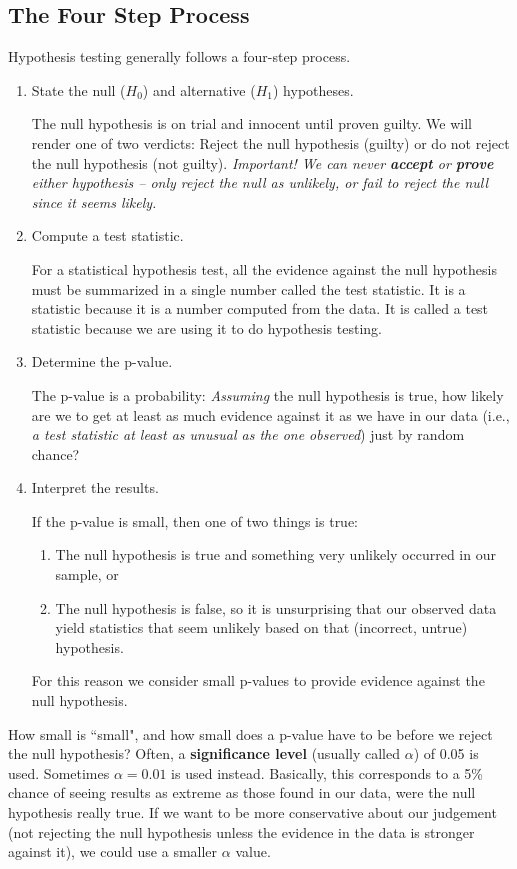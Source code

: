 \documentclass[twoside]{book}\usepackage[]{graphicx}\usepackage[]{xcolor}
\begin{document}
\subsection{The Four Step Process}
Hypothesis testing generally follows a four-step process.
\begin{enumerate}
	\item 
		State the null ($H_0$) and alternative ($H_1$) hypotheses.

		The null hypothesis is on trial and innocent until proven guilty.  We will
		render one of two verdicts:  Reject the null hypothesis (guilty) or do not reject
		the null hypothesis (not guilty).  \emph{Important!  We can never \textbf{accept} or \textbf{prove} either hypothesis -- only reject the null as unlikely, or fail to reject the null since it seems likely.}

	\item
		Compute a test statistic.

		For a statistical hypothesis test, all the evidence against the null hypothesis must be summarized in a
		single number called the test statistic.  It is a statistic because 
		it is a number computed from the data.  It is called a test statistic
		because we are using it to do hypothesis testing.

	\item
		Determine the p-value.

		The p-value is a probability:  \emph{Assuming} the null hypothesis is true,
		how likely are we to get at least as much evidence against it as we have in our data (i.e., \emph{a
		test statistic at least as unusual as the one observed}) just by random chance?

	\item
		Interpret the results.

		If the p-value is small, then one of two things is true:
		\begin{enumerate}
			\item The null hypothesis is true and something very unlikely occurred
				in our sample, or 
			\item The null hypothesis is false, so it is unsurprising that our observed data yield statistics that seem unlikely based on that (incorrect, untrue) hypothesis.
		\end{enumerate}
		For this reason we consider small p-values to provide evidence against the null
		hypothesis.
\end{enumerate}

How small is ``small", and how small does a p-value have to be before we reject the null hypothesis?  Often, a \textbf{significance level} (usually called $\alpha$) of 0.05 is used.  Sometimes $\alpha = 0.01$ is used instead.  Basically, this corresponds to a 5\% chance of seeing results as extreme as those found in our data, were the null hypothesis really true.  If we want to be more conservative about our judgement (not rejecting the null hypothesis unless the evidence in the data is stronger against it), we could use a smaller $\alpha$ value.
\end{document}
